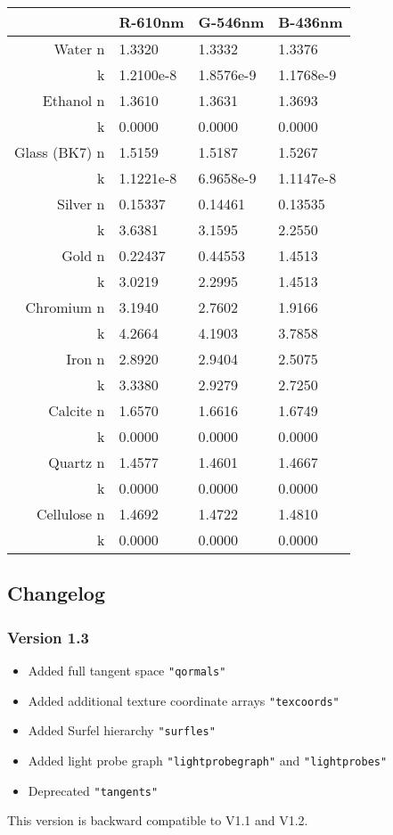 \documentclass[english,10pt,a4paper,twocolumn,colorscheme=green]{orarticle}
\begin{document}
	\begin{tabular}{|r|l|l|l|}
		\hline
		& R-610nm & G-546nm & B-436nm\\
		\hline
		Water n & 1.3320 & 1.3332 & 1.3376\\
		k & 1.2100e-8 & 1.8576e-9 & 1.1768e-9\\
		\hline
		Ethanol n & 1.3610 & 1.3631 & 1.3693\\
		k & 0.0000 & 0.0000 & 0.0000\\
		\hline
		Glass (BK7) n & 1.5159 & 1.5187 & 1.5267\\
		k & 1.1221e-8 & 6.9658e-9 & 1.1147e-8\\
		\hline
		Silver n & 0.15337 & 0.14461 & 0.13535\\
		k & 3.6381 & 3.1595 & 2.2550\\
		\hline
		Gold n & 0.22437 & 0.44553 & 1.4513\\
		k & 3.0219 & 2.2995 & 1.4513\\
		\hline
		Chromium n & 3.1940 & 2.7602 & 1.9166\\
		k & 4.2664 & 4.1903 & 3.7858\\
		\hline
		Iron n & 2.8920 & 2.9404 & 2.5075\\
		k & 3.3380 & 2.9279 & 2.7250\\
		\hline
		Calcite n & 1.6570 & 1.6616 & 1.6749\\
		k & 0.0000 & 0.0000 & 0.0000\\
		\hline
		Quartz n & 1.4577 & 1.4601 & 1.4667\\
		k & 0.0000 & 0.0000 & 0.0000\\
		\hline
		Cellulose n & 1.4692 & 1.4722 & 1.4810\\
		k & 0.0000 & 0.0000 & 0.0000\\
		\hline
	\end{tabular}
	
	\subsection{Changelog}
	\subsubsection{Version 1.3}
	\begin{itemize}
		\item Added full tangent space \lstinline|"qormals"|
		\item Added additional texture coordinate arrays \lstinline|"texcoords"|
		\item Added Surfel hierarchy \lstinline|"surfles"|
		\item Added light probe graph \lstinline|"lightprobegraph"| and \lstinline|"lightprobes"|
		\item Deprecated \lstinline|"tangents"|
	\end{itemize}
	This version is backward compatible to V1.1 and V1.2.
\end{document}
